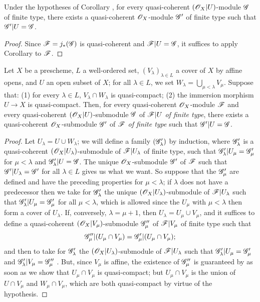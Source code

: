 \begin{cor}[9.4.5]
\label{1.9.4.5}
Under the hypotheses of Corollary , for every quasi-coherent $(\mathscr{O}_X|U)$-module
$\mathscr{G}$ of finite type, there exists a quasi-coherent $\mathscr{O}_X$-module $\mathscr{G}'$ of finite
type such that $\mathscr{G}'|U=\mathscr{G}$.
\end{cor}

\begin{proof}
\label{proof-1.9.4.5}
Since $\mathscr{F}=j_*(\mathscr{G})$ is quasi-coherent  and $\mathscr{F}|U=\mathscr{G}$, it
suffices to apply Corollary  to $\mathscr{F}$.
\end{proof}

\begin{lem}[9.4.6]
\label{1.9.4.6}
Let $X$ be a prescheme, $L$ a well-ordered set, $(V_\lambda)_{\lambda\in L}$ a cover of $X$
by affine opens, and $U$ an open subset of $X$; for all $\lambda\in L$, we set
$W_\lambda=\bigcup_{\mu<\lambda}V_\mu$. Suppose that: (1) for every $\lambda\in L$,
$V_\lambda\cap W_\lambda$ is quasi-compact; (2) the immersion morphism $U\to X$ is
quasi-compact. Then, for every quasi-coherent $\mathscr{O}_X$-module $\mathscr{F}$ and every
quasi-coherent $(\mathscr{O}_X|U)$-submodule $\mathscr{G}$ of $\mathscr{F}|U$ \emph{of finite type}, there
exists a quasi-coherent $\mathscr{O}_X$-submodule $\mathscr{G}'$ of $\mathscr{F}$ \emph{of finite type} such
that $\mathscr{G}'|U=\mathscr{G}$.
\end{lem}

\begin{proof}
\label{proof-1.9.4.6}
Let $U_\lambda=U\cup W_\lambda$; we will define a family $(\mathscr{G}'_\lambda)$ by induction,
where $\mathscr{G}'_\lambda$ is a quasi-coherent $(\mathscr{O}_X|U_\lambda)$-submodule of
$\mathscr{F}|U_\lambda$ of finite type, such that $\mathscr{G}'_\lambda|U_\mu=\mathscr{G}'_\mu$ for
$\mu<\lambda$ and $\mathscr{G}'_\lambda|U=\mathscr{G}$. The unique $\mathscr{O}_X$-submodule $\mathscr{G}'$ of
$\mathscr{F}$ such that $\mathscr{G}'|U_\lambda=\mathscr{G}'$ for all $\lambda\in L$  gives
us what we want. So suppose that the $\mathscr{G}'_\mu$ are defined and have the preceding
properties for $\mu<\lambda$; if $\lambda$ does not have a predecessor then we take for
$\mathscr{G}'_\lambda$ the unique $(\mathscr{O}_X|U_\lambda)$-submodule of $\mathscr{F}|U_\lambda$ such that
$\mathscr{G}'_\lambda|U_\mu=\mathscr{G}'_\mu$ for all $\mu<\lambda$, which is allowed since the $U_\mu$
with $\mu<\lambda$ then form a cover of $U_\lambda$. If, conversely, $\lambda=\mu+1$, then
$U_\lambda=U_\mu\cup V_\mu$, and it suffices to define a quasi-coherent
$(\mathscr{O}_X|V_\mu)$-submodule $\mathscr{G}''_\mu$ of $\mathscr{F}|V_\mu$ of finite type such that
\[
  \mathscr{G}''_\mu|(U_\mu\cap V_\mu)=\mathscr{G}'_\mu|(U_\mu\cap V_\mu);
\]
and then to take for $\mathscr{G}'_\lambda$ the $(\mathscr{O}_X|U_\lambda)$-submodule of
$\mathscr{F}|U_\lambda$ such that $\mathscr{G}'_\lambda|U_\mu=\mathscr{G}'_\mu$ and
$\mathscr{G}'_\lambda|V_\mu=\mathscr{G}''_\mu$ . But, since $V_\mu$ is affine, the
existence of $\mathscr{G}''_\mu$ is guaranteed by  as soon as we show that
$U_\mu\cap V_\mu$ is quasi-compact; but $U_\mu\cap V_\mu$ is the union of $U\cap V_\mu$ and
$W_\mu\cap V_\mu$, which are both quasi-compact by virtue of the hypothesis.
\end{proof}

